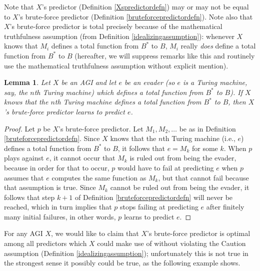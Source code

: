 \documentclass{article}
\newtheorem{lemma}[theorem]{Lemma}
\begin{document}
Note that $X$'s predictor (Definition \ref{Xspredictordefn})
may or may not be equal to $X$'s brute-force predictor
(Definition \ref{bruteforcepredictordefn}). Note also that $X$'s brute-force predictor
is total precisely because of the mathematical truthfulness assumption
(from Definition \ref{idealizingassumption}): whenever $X$ knows that
$M_i$ defines a total function from $B^*$ to $B$, $M_i$ really \emph{does}
define a total function from $B^*$ to $B$ (hereafter, we will suppress
remarks like this and routinely use the mathematical truthfulness assumption
without explicit mention).

\begin{lemma}
\label{knowingimplieslearninglemma}
    Let $X$ be an AGI and let $e$ be an evader (so $e$ is a Turing machine,
    say, the $n$th Turing machine) which
    defines a total function from $B^*$ to $B$).
    If $X$ knows that the $n$th Turing machine defines a total function from $B^*$ to $B$,
    then $X$'s brute-force predictor learns to predict $e$.
\end{lemma}

\begin{proof}
    Let $p$ be $X$'s brute-force predictor.
    Let $M_1,M_2,\ldots$ be as in Definition \ref{bruteforcepredictordefn}.
    Since $X$ knows that the $n$th Turing machine (i.e., $e$) defines a total
    function from $B^*$ to $B$,
    it follows that $e=M_k$ for some $k$.
    When $p$ plays against $e$, it cannot occur that $M_k$ is ruled out
    from being the evader, because in order for that to occur, $p$ would have
    to fail at predicting $e$ when $p$ assumes that $e$ computes the same
    function as $M_k$, but that cannot fail because that assumption is true.
    Since $M_k$ cannot be ruled out from being the evader, it follows that
    step $k+1$ of Definition \ref{bruteforcepredictordefn} will never be
    reached, which in turn implies that $p$ stops failing at predicting $e$
    after finitely many initial failures, in other words, $p$ learns to
    predict $e$.
\end{proof}

For any AGI $X$, we would like to claim that $X$'s brute-force predictor is
optimal among all predictors which $X$ could make use of without violating the
Caution assumption (Definition \ref{idealizingassumption}); unfortunately this
is not true in the strongest sense it possibly could be true, as the following
example shows.
\end{document}
